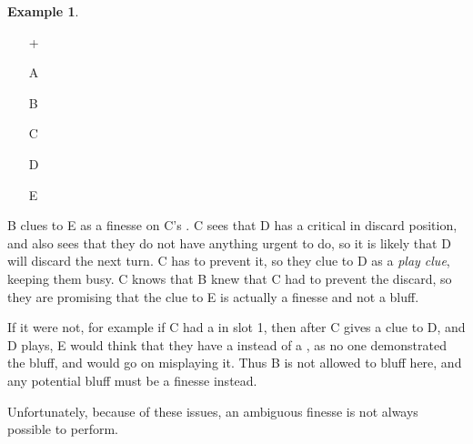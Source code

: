 \documentclass[a4paper]{article}
\theoremstyle{plain}
\theoremstyle{definition}
\newtheorem{example}[theorem]{Example}
\begin{document}
\begin{example}	\hfill \\
	\begin{minipage}{0.45\textwidth}
		\begin{itemize}
			\item[\Large +]      
			\item[\Large A]    
			\item[\Large B]    
			\item[\Large C]     
			\item[\Large D]    
			\item[\Large E]    
		\end{itemize}
	\end{minipage}%
	\begin{minipage}{0.55\textwidth}
		B clues  to E as a finesse on C's . C sees that D has a critical  in discard position, and also sees that they do not have anything urgent to do, so it is likely that D will discard the next turn. C has to prevent it, so they clue  to D as a \emph{play clue}, keeping them busy. C knows that B knew that C had to prevent the  discard, so they are promising that the  clue to E is actually a finesse and not a bluff.
		
		If it were not, for example if C had a  in slot 1, then after C gives a clue to D, and D plays, E would think that they have a  instead of a , as no one demonstrated the bluff, and would go on misplaying it. Thus B is not allowed to bluff here, and any potential bluff must be a finesse instead.
	\end{minipage}
\end{example} \vspace{0.15 cm}

Unfortunately, because of these issues, an ambiguous finesse is not always possible to perform.
\end{document}
